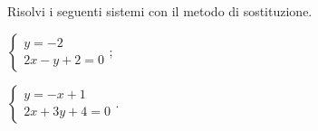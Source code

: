 \begin{esercizio}
 \label{ese:22.7}
Risolvi i seguenti sistemi con il metodo di sostituzione.
 \begin{multicols}{2}
 \begin{enumeratea}
  \item $\left\{\begin{array}{l}
     y=-2\\
     2x-y+2=0
    \end{array}\right.;$
  \item $\left\{\begin{array}{l}
	   y=-x+1\\
	   2x+3y+4=0
       \end{array}\right..$
 \end{enumeratea}
 \end{multicols}
\end{esercizio}

